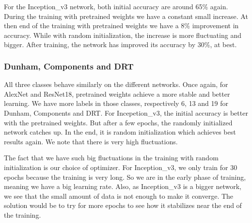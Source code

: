 For the Inception\_v3 network, both initial accuracy are around 65\% again. During the training with pretrained weights we have a constant small increase. At then end of the training with pretrained weights we have a 8\% improvement in accuracy. While with random initialization, the increase is more fluctuating and bigger. After training, the network has improved its accuracy by 30\%, at best.

\subsubsection{Dunham, Components and DRT}
All three classes behave similarly on the different networks. Once again, for AlexNet and ResNet18, pretrained weights achieve a more stable and better learning. We have more labels in those classes, respectively 6, 13 and 19 for Dunham, Components and DRT. 
For Incepetion\_v3, the initial accuracy is better with the pretrained weights. But after a few epochs, the randomly initialized network catches up. In the end, it is random initialization which achieves best results again. We note that there is very high fluctuations. 

The fact that we have such big fluctuations in the training with random initialization is our choice of optimizer. For Inception\_v3, we only train for 30 epochs because the training is very long. So we are in the early phase of training, meaning we have a big learning rate. Also, as Inception\_v3 is a bigger network, we see  that the small amount of data is not enough to make it converge. The solution would be to try for more epochs to see how it stabilizes near the end of the training. 

